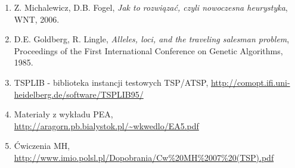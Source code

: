 \documentclass[a4paper,12pt]{article}
\begin{document}
\begin{enumerate}
    \item Z. Michalewicz, D.B. Fogel, \textit{Jak to rozwiązać, czyli nowoczesna heurystyka}, WNT, 2006.
    \item D.E. Goldberg, R. Lingle, \textit{Alleles, loci, and the traveling salesman problem}, Proceedings of the First International Conference on Genetic Algorithms, 1985.
    \item TSPLIB - biblioteka instancji testowych TSP/ATSP, \url{http://comopt.ifi.uni-heidelberg.de/software/TSPLIB95/}
    \item Materiały z wykładu PEA, \url{http://aragorn.pb.bialystok.pl/~wkwedlo/EA5.pdf}
    \item Ćwiczenia MH, \url{http://www.imio.polsl.pl/Dopobrania/Cw%20MH%2007%20(TSP).pdf}
\end{enumerate}
\end{document}
